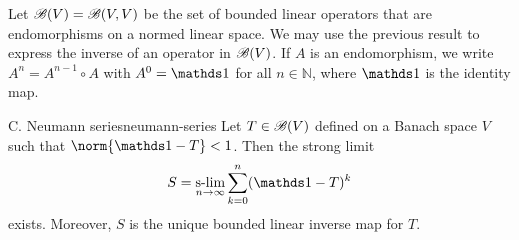 Let \(\mathscr{B}(V) = \mathscr{B}(V,V)\) be the set of bounded linear operators that are endomorphisms on a normed linear space. We may use the previous result to express the inverse of an operator in \(\mathscr{B}(V)\). If \(A\) is an endomorphism, we write \(A^n = A^{n-1}\circ A\) with \(A^0 = \unity\) for all \(n \in \mathbb{N}\), where \(\unity\) is the identity map.
\begin{theorem}{C. Neumann series}{neumann-series}
    Let \(T \in \mathscr{B}(V)\) defined on a Banach space \(V\) such that \(\norm{\unity - T} < 1\). Then the strong limit
    \begin{equation*}
        S = \slim_{n\to \infty} \sum_{k = 0}^{n} (\unity - T)^k
    \end{equation*}
    exists. Moreover, \(S\) is the unique bounded linear inverse map for \(T\).
\end{theorem}
